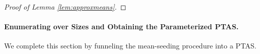 \documentclass[10pt,a4paper]{amsart}
\newtheorem{theorem}{Theorem}[section]
\begin{document}
\begin{proof}[Proof of Lemma \ref{lem:approxmeans}]
\end{proof}

\paragraph{Enumerating over Sizes and Obtaining the Parameterized PTAS.}
We complete this section by funneling the mean-seeding procedure into a PTAS.
\end{document}
